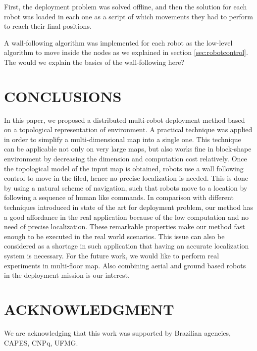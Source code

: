 \documentclass[twocolumn]{svjour3}       %
\begin{document}
{\color{red}
First, the deployment problem was solved offline, and then the solution for each robot was loaded in each one as a script of which movements they had to perform to reach their final positions. 
}

A wall-following algorithm was implemented for each robot as the low-level algorithm to move inside the nodes as we explained in section \ref{sec:robotcontrol}. The 
{\color{green}would we explain the basics of the wall-following here?}

\section{CONCLUSIONS}
\label{sec:conclusion}

In this paper, we proposed a distributed multi-robot deployment method based on a topological representation of environment. A practical technique was applied in order to simplify a multi-dimensional map into a single one. This technique can be applicable not only on very large maps, but also works fine in block-shape environment by decreasing the dimension and computation cost relatively.
%
Once the topological model of the input map is obtained, robots use a wall following control to move in the filed, hence no precise localization is needed. This is done by using a natural scheme of navigation, such that robots move to a location by following a sequence of human like commands. 
%
In comparison with different techniques introduced in state of the art for deployment problem, our method has a good affordance in the real application because of the low computation and no need of precise localization. These remarkable properties make our method fast enough to be executed in the real world scenarios. This issue can also be considered as a shortage in such application that having an accurate localization system is necessary.
%
For the future work, we would like to perform real experiments in multi-floor map. Also combining aerial and ground based robots in the deployment mission is our interest. 

\section*{ACKNOWLEDGMENT}

We are acknowledging that this work was supported by Brazilian agencies, CAPES, CNPq, UFMG.


 
\end{document}
